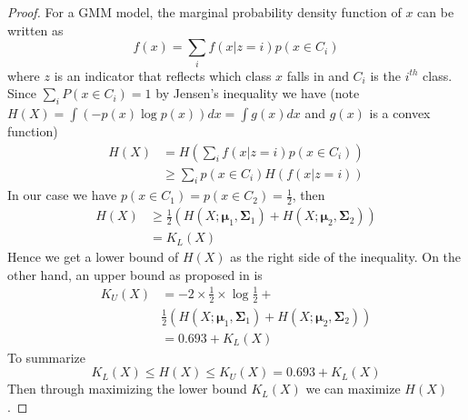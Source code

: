 \documentclass[11pt]{article}
\begin{document}
\begin{proof}
    For a GMM model, the marginal probability density function of $x$ can be written as
    \begin{equation}
        f(x)=\sum_i f(x|z=i)p(x\in C_i)
    \end{equation}
    where $z$ is an indicator that reflects which class $x$ falls in and $C_i$ is the $i^{th}$ class. Since $\sum_i P(x\in C_i) = 1$ by Jensen's inequality we have (note $H(X)=\int(-p(x)\log p(x))dx=\int g(x)dx$ and $g(x)$ is a convex function)
    \begin{equation}
    \begin{split}
    H(X) &= H\left(\sum_i f(x|z=i)p(x\in C_i)\right) \\ & \geq \sum_i p(x\in C_i) H(f(x|z=i))
    \end{split}
    \end{equation}
    In our case we have $p(x\in C_1) = p(x \in C_2)=\frac{1}{2}$, then
    \begin{equation}
    \begin{split}
        H(X) &\geq \frac{1}{2}\left(H(X; \bm{\mu}_1, \bm{\Sigma}_1) + H(X; \bm{\mu}_2, \bm{\Sigma}_2)\right) \\
        & = K_L(X)
    \end{split}
    \end{equation}
    Hence we get a lower bound of $H(X)$ as the right side of the inequality. On the other hand, an upper bound as proposed in \citet{huber2008entropy} is
    \begin{equation}
    \begin{split}
        K_U(X) &= -2\times \frac{1}{2} \times \log\frac{1}{2} + \\
        & \frac{1}{2}\left(H(X; \bm{\mu}_1, \bm{\Sigma}_1) + H(X; \bm{\mu}_2, \bm{\Sigma}_2)\right) \\
        &= 0.693 + K_L(X)
    \end{split}
    \end{equation}
    To summarize
    \begin{equation}
        K_L(X) \leq H(X) \leq K_U(X) = 0.693+K_L(X) 
    \end{equation}
    Then through maximizing the lower bound $K_L(X)$ we can maximize $H(X)$.
\end{proof} 
\end{document}
